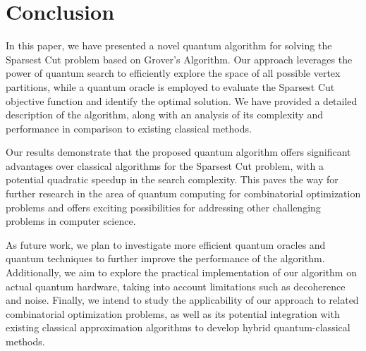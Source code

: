 \section{Conclusion}
\label{sec:conclusion}

In this paper, we have presented a novel quantum algorithm for solving the Sparsest Cut problem based on Grover's Algorithm. Our approach leverages the power of quantum search to efficiently explore the space of all possible vertex partitions, while a quantum oracle is employed to evaluate the Sparsest Cut objective function and identify the optimal solution. We have provided a detailed description of the algorithm, along with an analysis of its complexity and performance in comparison to existing classical methods.

Our results demonstrate that the proposed quantum algorithm offers significant advantages over classical algorithms for the Sparsest Cut problem, with a potential quadratic speedup in the search complexity. This paves the way for further research in the area of quantum computing for combinatorial optimization problems and offers exciting possibilities for addressing other challenging problems in computer science.

As future work, we plan to investigate more efficient quantum oracles and quantum techniques to further improve the performance of the algorithm. Additionally, we aim to explore the practical implementation of our algorithm on actual quantum hardware, taking into account limitations such as decoherence and noise. Finally, we intend to study the applicability of our approach to related combinatorial optimization problems, as well as its potential integration with existing classical approximation algorithms to develop hybrid quantum-classical methods.

